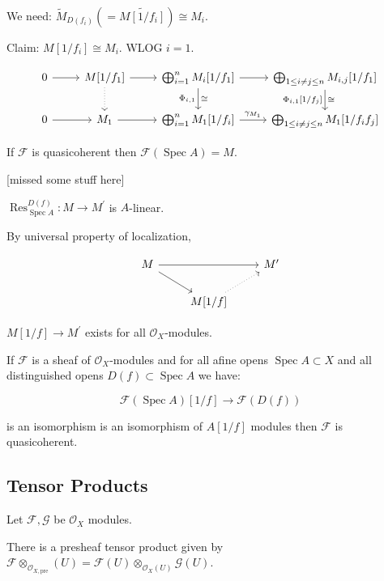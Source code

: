 \documentclass{article}
\theoremstyle{definition}
\begin{document}
    We need: \(\widetilde{M}_{D(f_i)} (= \widetilde{M[1 / f_i]}) \cong M_i\).

    Claim: \(M[1 / f_i] \cong M_i\). WLOG \(i = 1\).

    \[
        \begin{tikzcd}
            0 \ar[r] & M[1 / f_1] \ar[d, dotted] \ar[r] & \bigoplus_{i=1}^n M_i[1 / f_1] \ar[d,"\cong", "{\Phi_{i,1}}"'] \ar[r] & \bigoplus_{1 \leq i\neq j \leq n} M_{i,j} [1 / f_1] \ar[d,"\cong", "{\Phi_{i,1}[1 / f_j]}"'] \\ 0 \ar[r] & M_1 \ar[r] & \bigoplus_{i=1}^n M_1[1 / f_i] \ar[r,"\gamma_{M_1}"] & \bigoplus_{1 \leq i\neq j \leq n} M_1[1 / f_i f_j]     
        \end{tikzcd}
    \]

    If \(\mathcal{F}\) is quasicoherent then \(\mathcal{F} (\operatorname{Spec} A) = M\).

    [missed some stuff here]

    \(\operatorname{Res}^{D(f)}_{\operatorname{Spec} A}: M \to M^{\prime}\) is \(A\)-linear.
    
    By universal property of localization,

    \[
        \begin{tikzcd}
            M \ar[rr] \ar[rd] & & M^{\prime} \\ & M[1 / f] \ar[ru, dotted]
        \end{tikzcd}
    \]

    \(M[1 / f] \to M^{\prime}\) exists for all \(\mathcal{O}_X\)-modules.
    
    If \(\mathcal{F}\) is a sheaf of \(\mathcal{O} _X\)-modules and for all afine opens \(\operatorname{Spec} A \subset X\) and all distinguished opens \(D(f) \subset \operatorname{Spec} A\) we have:

    \[
        \mathcal{F} (\operatorname{Spec} A)[1 / f] \to \mathcal{F} (D(f))
    \]

    is an isomorphism is an isomorphism of \(A[1 / f]\) modules then \(\mathcal{F} \) is quasicoherent.

    \subsection*{Tensor Products}

    Let \(\mathcal{F} , \mathcal{G}\) be \(\mathcal{O}_X\) modules.

    There is a presheaf tensor product given by \(\mathcal{F} \otimes_{\mathcal{O}_{X,\text{pre}}}(U) = \mathcal{F}(U) \otimes_{\mathcal{O}_X(U)} \mathcal{G}(U)\).
    
\end{document}
